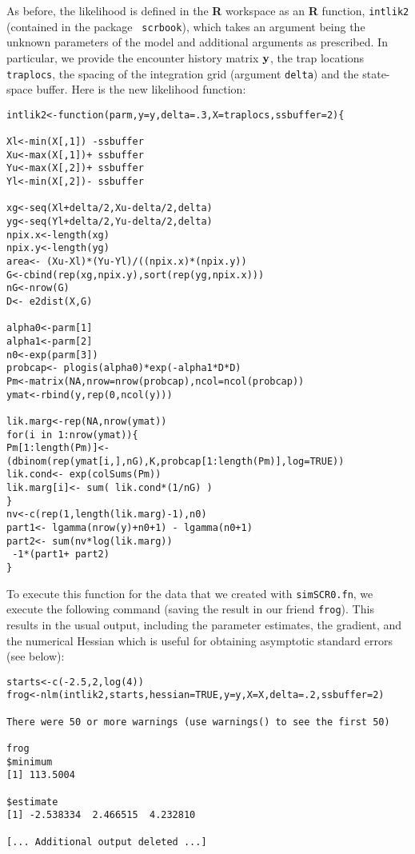 As before, the likelihood is defined in the {\bf R} workspace as an
{\bf R}
function, \mbox{\tt intlik2} (contained in the package \mbox{\tt
  scrbook}),
 which takes an argument being the unknown parameters of the
model and additional arguments as prescribed. In particular, 
 we provide the encounter history matrix ${\bf y}$, the trap locations
\mbox{\tt traplocs}, the spacing of the integration grid (argument
\mbox{\tt delta}) and the
state-space buffer. Here is the new likelihood function:
{\small
\begin{verbatim}
intlik2<-function(parm,y=y,delta=.3,X=traplocs,ssbuffer=2){

Xl<-min(X[,1]) -ssbuffer
Xu<-max(X[,1])+ ssbuffer
Yu<-max(X[,2])+ ssbuffer
Yl<-min(X[,2])- ssbuffer

xg<-seq(Xl+delta/2,Xu-delta/2,delta) 
yg<-seq(Yl+delta/2,Yu-delta/2,delta) 
npix.x<-length(xg)
npix.y<-length(yg)
area<- (Xu-Xl)*(Yu-Yl)/((npix.x)*(npix.y))
G<-cbind(rep(xg,npix.y),sort(rep(yg,npix.x)))
nG<-nrow(G)
D<- e2dist(X,G) 

alpha0<-parm[1]
alpha1<-parm[2]
n0<-exp(parm[3])
probcap<- plogis(alpha0)*exp(-alpha1*D*D)
Pm<-matrix(NA,nrow=nrow(probcap),ncol=ncol(probcap))
ymat<-rbind(y,rep(0,ncol(y)))

lik.marg<-rep(NA,nrow(ymat))
for(i in 1:nrow(ymat)){
Pm[1:length(Pm)]<- (dbinom(rep(ymat[i,],nG),K,probcap[1:length(Pm)],log=TRUE))
lik.cond<- exp(colSums(Pm))
lik.marg[i]<- sum( lik.cond*(1/nG) )  
}                                                 
nv<-c(rep(1,length(lik.marg)-1),n0)
part1<- lgamma(nrow(y)+n0+1) - lgamma(n0+1)
part2<- sum(nv*log(lik.marg))
 -1*(part1+ part2)
}
\end{verbatim}
}
To execute this function for the data that we created with \mbox{\tt simSCR0.fn},
 we execute the following command (saving the result in our
friend \mbox{\tt frog}).
This results in the usual output, including the parameter estimates,
the gradient, and the numerical Hessian which is useful for obtaining
asymptotic standard errors (see below):
\begin{verbatim}
starts<-c(-2.5,2,log(4))
frog<-nlm(intlik2,starts,hessian=TRUE,y=y,X=X,delta=.2,ssbuffer=2)

There were 50 or more warnings (use warnings() to see the first 50)

frog
$minimum
[1] 113.5004

$estimate
[1] -2.538334  2.466515  4.232810

[... Additional output deleted ...]
\end{verbatim}
